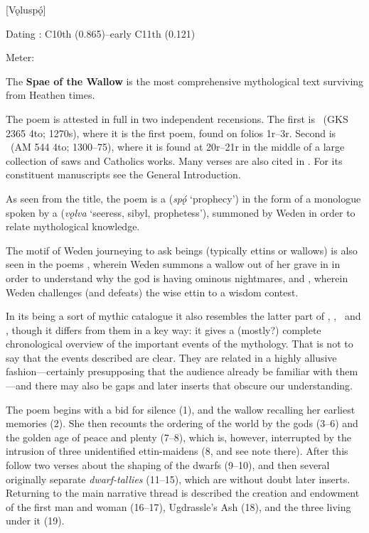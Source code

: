 [Vǫluspǫ́]

\begin{flushright}%
Dating \parencite{Sapp2022}: C10th (0.865)–early C11th (0.121)

Meter: \Fornyrdislag%
\end{flushright}

The \textbf{Spae of the Wallow} is the most comprehensive mythological text surviving from Heathen times.

The poem is attested in full in two independent recensions. The first is \Regius\ (GKS 2365 4to; 1270s), where it is the first poem, found on folios 1r–3r. Second is \Hauksbok\ (AM 544 4to; 1300–75), where it is found at 20r–21r in the middle of a large collection of saws and Catholics works. Many verses are also cited in \Gylfaginning. For its constituent manuscripts see the General Introduction. %

As seen from the title, the poem is a  (\emph{spǫ́} ‘prophecy’) in the form of a monologue spoken by a  (\emph{vǫlva} ‘seeress, sibyl, prophetess’), summoned by Weden in order to relate mythological knowledge.

The motif of Weden journeying to ask beings (typically ettins or wallows) is also seen in the poems \Baldrsdraumar, wherein Weden summons a wallow out of her grave in  in order to understand why the god  is having ominous nightmares, and \Vafthrudnismal, wherein Weden challenges (and defeats) the wise ettin  to a wisdom contest.

In its being a sort of mythic catalogue it also resembles the latter part of \Havamal, \Grimnismal, \Sigrdrifumal\ and \Allvismal, though it differs from them in a key way: it gives a (mostly?) complete chronological overview of the important events of the mythology. That is not to say that the events described are clear. They are related in a highly allusive fashion—certainly presupposing that the audience already be familiar with them—and there may also be gaps and later inserts that obscure our understanding.

\sectionline

The poem begins with a bid for silence (1), and the wallow recalling her earliest memories (2). She then recounts the ordering of the world by the gods (3–6) and the golden age of peace and plenty (7–8), which is, however, interrupted by the intrusion of three unidentified ettin-maidens (8, and see note there). After this follow two verses about the shaping of the dwarfs (9–10), and then several originally separate \emph{dwarf-tallies} (11–15), which are without doubt later inserts. Returning to the main narrative thread is described the creation and endowment of the first man and woman (16–17), Ugdrassle’s Ash (18), and the three  living under it (19).

